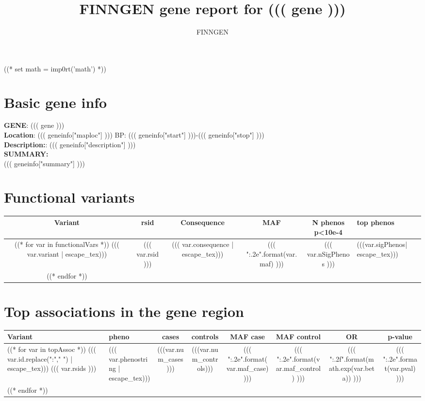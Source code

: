 \documentclass{article}
\begin{document}
\title {FINNGEN gene report for ((( gene ))) }
\author{FINNGEN}
\maketitle
\newpage
\newpage
((* set math = imp0rt('math') *))
\section{ Basic gene info }
\textbf{GENE}: ((( gene ))) \\
\medskip
\textbf{Location}: ((( geneinfo["maploc"] ))) BP: ((( geneinfo["start"] )))-((( geneinfo["stop"] ))) \\
\medskip
\textbf{Description:}: ((( geneinfo["description"] ))) \\
\medskip
\textbf{SUMMARY:} \\
((( geneinfo["summary"] )))
\newpage

\begingroup
\renewcommand{\arraystretch}{1.5}
\section{ Functional variants }
\begin{longtable}{c|c|c|c|c|L{5cm} }
Variant & rsid & Consequence & MAF & N phenos p\textless10e-4 & top phenos \\
\hline

((* for var in functionalVars *))
    ((( var.variant | escape_tex))) & ((( var.rsid ))) & (((  var.consequence | escape_tex))) & ((( "{:.2e}".format(var.maf) ))) & ((( var.nSigPhenos ))) & (((var.sigPhenos| escape_tex)))  \\
((* endfor *))

\end{longtable}
\newpage

\section{ Top associations in the gene region }
\begin{longtable}{ >{\RaggedRight}p{3cm}|>{\RaggedRight}p{3cm}|c|c|c|c|c|c }
Variant & pheno & cases & controls & MAF case & MAF control & OR & p-value  \\
\hline
((* for var in topAssoc *))
((( var.id.replace(":"," ") | escape_tex))) \newline ((( var.rsids ))) & ((( var.phenostring | escape_tex))) & (((var.num_cases ))) & (((var.num_controls))) & ((( "{:.2e}".format(var.maf_case) ))) & ((( "{:.2e}".format(var.maf_control) ))) & ((( "{:.2f}".format(math.exp(var.beta)) ))) & ((( "{:.2e}".format(var.pval) ))) \\
((* endfor *))
\end{longtable}
\end{document}
